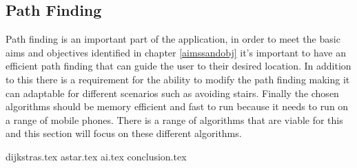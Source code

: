 \subsection{Path Finding}
Path finding is an important part of the application, in order to meet the basic aims and objectives identified in chapter \ref{aimssandobj} it's important to have an efficient path finding that can guide the user to their desired location. In addition to this there is a requirement for the ability to modify the path finding making it can adaptable for different scenarios such as avoiding stairs. Finally the chosen algorithms should be memory efficient and fast to run because it needs to run on a range of mobile phones. There is a range of algorithms that are viable for this and this section will focus on these different algorithms.

{dijkstras.tex}
{astar.tex}
{ai.tex}
{conclusion.tex}